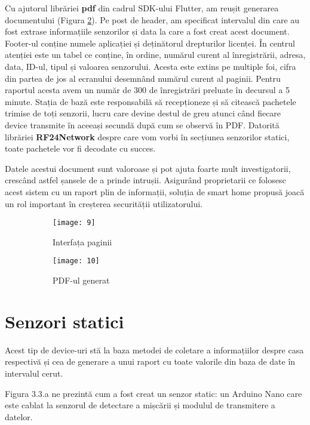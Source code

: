 Cu ajutorul librăriei \textbf{pdf} din cadrul SDK-ului Flutter, am reușit generarea documentului (Figura \ref{fig:10}). Pe post de header, am specificat intervalul din care au fost extrase informațiile senzorilor și data la care a fost creat acest document. Footer-ul conține numele aplicației și deținătorul drepturilor licenței. În centrul atenției este un tabel ce conține, în ordine, numărul curent al înregistrării, adresa, data, ID-ul, tipul și valoarea senzorului. Acesta este extins pe multiple foi, cifra din partea de jos al ecranului desemnând numărul curent al paginii. Pentru raportul acesta avem un număr de 300 de înregistrări preluate în decursul a 5 minute. Stația de bază este responsabilă să recepționeze și să citească pachetele trimise de toți senzorii, lucru care devine destul de greu atunci când fiecare device transmite în aceeași secundă după cum se observă în PDF. Datorită librăriei \textbf{RF24Network} despre care vom vorbi în secțiunea senzorilor statici, toate pachetele vor fi decodate cu succes.

Datele acestui document sunt valoroase și pot ajuta foarte mult investigatorii, crescând astfel șansele de a prinde intrușii. Asigurând proprietarii ce folosesc acest sistem cu un raport plin de informații, soluția de smart home propusă joacă un rol important în creșterea securității utilizatorului.

\begin{figure}[h]
	\centering
	\begin{subfigure}{0.43\textwidth}
		\centering
		\texttt{[image: 9]}
		\caption{Interfața paginii}
		\label{fig:9}
	\end{subfigure}
	\hfill
	\begin{subfigure}{0.43\textwidth}
		\centering
		\texttt{[image: 10]}
		\caption{PDF-ul generat}
		\label{fig:10}
	\end{subfigure}
	\caption{}
	\label{fig:all4}
\end{figure}
\break

\section{Senzori statici}

Acest tip de device-uri stă la baza metodei de coletare a informațiilor despre casa respectivă și cea de generare a unui raport cu toate valorile din baza de date în intervalul cerut.

Figura 3.3.a ne prezintă cum a fost creat un senzor static: un Arduino Nano care este cablat la senzorul de detectare a mișcării și modulul de transmitere a datelor. 

